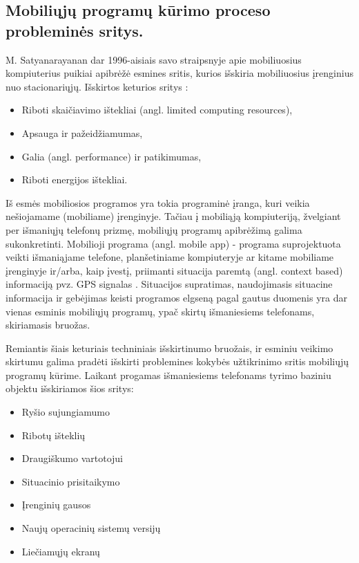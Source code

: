 \documentclass{VUMIFPSkursinis}
\begin{document}
\subsection{Mobiliųjų programų kūrimo proceso probleminės sritys.}
M. Satyanarayanan dar 1996-aisiais savo straipsnyje apie mobiliuosius kompiuterius puikiai apibrėžė esmines sritis, kurios išskiria mobiliuosius įrenginius nuo stacionariųjų. Išskirtos keturios sritys \cite{Satyanarayanan:1996:FCM:248052.248053}:
\begin{itemize}
   \item Riboti skaičiavimo ištekliai (angl. limited computing resources),
   \item Apsauga ir pažeidžiamumas,
   \item Galia (angl. performance) ir patikimumas,
   \item Riboti energijos ištekliai.
\end{itemize}
\bigskip
Iš esmės mobiliosios programos yra tokia programinė įranga, kuri veikia nešiojamame (mobiliame) įrenginyje. Tačiau į mobiliąją kompiuteriją, žvelgiant per išmaniųjų telefonų prizmę, mobiliųjų programų apibrėžimą galima sukonkretinti. Mobilioji programa (angl. mobile app) - programa suprojektuota veikti išmaniąjame telefone, planšetiniame kompiuteryje ar kitame mobiliame įrenginyje ir/arba, kaip įvestį, priimanti situacija paremtą (angl. context based) informaciją pvz. GPS signalas \cite{6496451}. Situacijos supratimas, naudojimasis situacine informacija ir gebėjimas keisti programos elgseną pagal gautus duomenis yra dar vienas esminis mobiliųjų programų, ypač skirtų išmaniesiems telefonams, skiriamasis bruožas.

Remiantis šiais keturiais techniniais išskirtinumo bruožais, ir esminiu veikimo skirtumu galima pradėti išskirti problemines kokybės užtikrinimo sritis mobiliųjų programų kūrime. Laikant progamas išmaniesiems telefonams tyrimo baziniu objektu išskiriamos šios sritys:
\begin{itemize}
  \item  Ryšio sujungiamumo
  \item Ribotų išteklių
  \item Draugiškumo vartotojui
  \item Situacinio prisitaikymo
  \item Įrenginių gausos
  \item Naujų operacinių sistemų versijų
  \item Liečiamųjų ekranų
\end{itemize}
\end{document}
